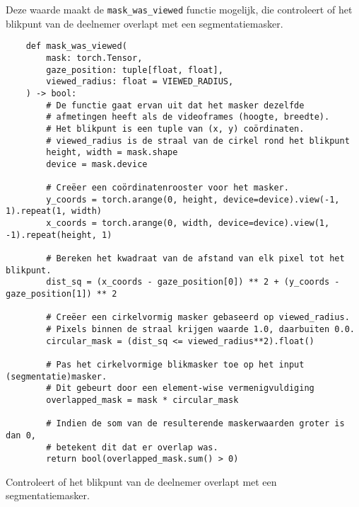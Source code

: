 Deze waarde maakt de \texttt{mask\_was\_viewed} functie mogelijk, die controleert of het blikpunt van de deelnemer overlapt met een segmentatiemasker.

\begin{listing}[H]
  \begin{verbatim}
    def mask_was_viewed(
        mask: torch.Tensor,
        gaze_position: tuple[float, float],
        viewed_radius: float = VIEWED_RADIUS,
    ) -> bool:
        # De functie gaat ervan uit dat het masker dezelfde
        # afmetingen heeft als de videoframes (hoogte, breedte).
        # Het blikpunt is een tuple van (x, y) coördinaten.
        # viewed_radius is de straal van de cirkel rond het blikpunt
        height, width = mask.shape
        device = mask.device

        # Creëer een coördinatenrooster voor het masker.
        y_coords = torch.arange(0, height, device=device).view(-1, 1).repeat(1, width)
        x_coords = torch.arange(0, width, device=device).view(1, -1).repeat(height, 1)

        # Bereken het kwadraat van de afstand van elk pixel tot het blikpunt.
        dist_sq = (x_coords - gaze_position[0]) ** 2 + (y_coords - gaze_position[1]) ** 2

        # Creëer een cirkelvormig masker gebaseerd op viewed_radius.
        # Pixels binnen de straal krijgen waarde 1.0, daarbuiten 0.0.
        circular_mask = (dist_sq <= viewed_radius**2).float()
        
        # Pas het cirkelvormige blikmasker toe op het input (segmentatie)masker.
        # Dit gebeurt door een element-wise vermenigvuldiging 
        overlapped_mask = mask * circular_mask

        # Indien de som van de resulterende maskerwaarden groter is dan 0,
        # betekent dit dat er overlap was.
        return bool(overlapped_mask.sum() > 0)

  \end{verbatim}
  \caption[\texttt{mask\_was\_viewed} functie]{
    Controleert of het blikpunt van de deelnemer overlapt met een segmentatiemasker.
  }
\end{listing}

